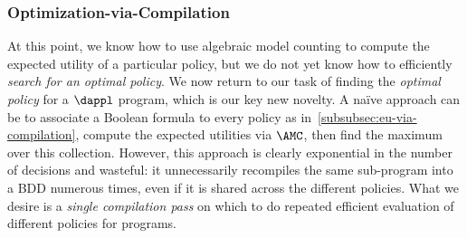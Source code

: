 

\subsubsection{Optimization-via-Compilation}\label{subsubsec:optimization-via-compilation}
At this point, we know how to use algebraic model counting to compute the expected utility
of a particular policy, but we do not yet know how to efficiently \emph{search for an optimal policy}.
We now return to our task of finding the \emph{optimal policy}
for a $\dappl$ program, which is our key new novelty.
A na\"{i}ve approach can be to
associate a Boolean formula to every policy as in~\cref{subsubsec:eu-via-compilation},
compute the expected utilities via $\AMC$, then find the maximum over this collection.
However, this approach is clearly exponential in the number of decisions and wasteful:
it unnecessarily recompiles the same sub-program into a BDD
numerous times, even if it is shared across the different policies.
What we
desire is a \emph{single compilation pass} on which to do repeated
efficient evaluation of different policies for \dappl{} programs.



